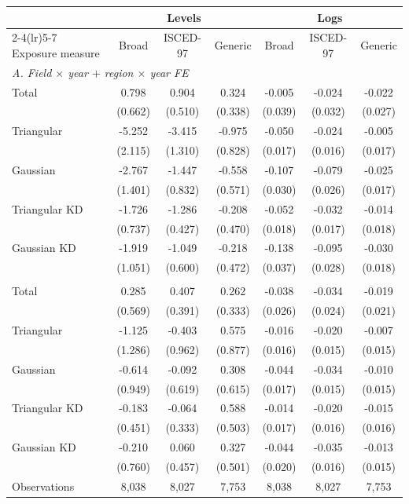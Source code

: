 \begin{tabular}{lcccccc}
\toprule
 & \multicolumn{3}{c}{Levels} & \multicolumn{3}{c}{Logs} \\
\cmidrule(lr){2-4}\cmidrule(lr){5-7}
Exposure measure & Broad & ISCED-97 & Generic & Broad & ISCED-97 & Generic \\
\midrule
\multicolumn{7}{l}{\textit{A. Field \(\times\) year \(+\) region \(\times\) year FE}} \\
Total &  0.798 &  0.904\sym{*} &  0.324 & -0.005 & -0.024 & -0.022 \\
 & (0.662) & (0.510) & (0.338) & (0.039) & (0.032) & (0.027) \\
Triangular & -5.252\sym{**} & -3.415\sym{***} & -0.975 & -0.050\sym{***} & -0.024 & -0.005 \\
 & (2.115) & (1.310) & (0.828) & (0.017) & (0.016) & (0.017) \\
Gaussian & -2.767\sym{*} & -1.447\sym{*} & -0.558 & -0.107\sym{***} & -0.079\sym{***} & -0.025 \\
 & (1.401) & (0.832) & (0.571) & (0.030) & (0.026) & (0.017) \\
Triangular KD & -1.726\sym{**} & -1.286\sym{***} & -0.208 & -0.052\sym{***} & -0.032\sym{*} & -0.014 \\
 & (0.737) & (0.427) & (0.470) & (0.018) & (0.017) & (0.018) \\
Gaussian KD & -1.919\sym{*} & -1.049\sym{*} & -0.218 & -0.138\sym{***} & -0.095\sym{***} & -0.030\sym{*} \\
 & (1.051) & (0.600) & (0.472) & (0.037) & (0.028) & (0.018) \\
\addlinespace
\multicolumn{7}{l}{\textit{B. \(+\) selectivity decile \(\times\) year FE}} \\
Total &  0.285 &  0.407 &  0.262 & -0.038 & -0.034 & -0.019 \\
 & (0.569) & (0.391) & (0.333) & (0.026) & (0.024) & (0.021) \\
Triangular & -1.125 & -0.403 &  0.575 & -0.016 & -0.020 & -0.007 \\
 & (1.286) & (0.962) & (0.877) & (0.016) & (0.015) & (0.015) \\
Gaussian & -0.614 & -0.092 &  0.308 & -0.044\sym{**} & -0.034\sym{**} & -0.010 \\
 & (0.949) & (0.619) & (0.615) & (0.017) & (0.015) & (0.015) \\
Triangular KD & -0.183 & -0.064 &  0.588 & -0.014 & -0.020 & -0.015 \\
 & (0.451) & (0.333) & (0.503) & (0.017) & (0.016) & (0.016) \\
Gaussian KD & -0.210 &  0.060 &  0.327 & -0.044\sym{**} & -0.035\sym{**} & -0.013 \\
 & (0.760) & (0.457) & (0.501) & (0.020) & (0.016) & (0.015) \\
\midrule
Observations &     8,038 &     8,027 &     7,753 &     8,038 &     8,027 &     7,753 \\
\bottomrule
\end{tabular}
